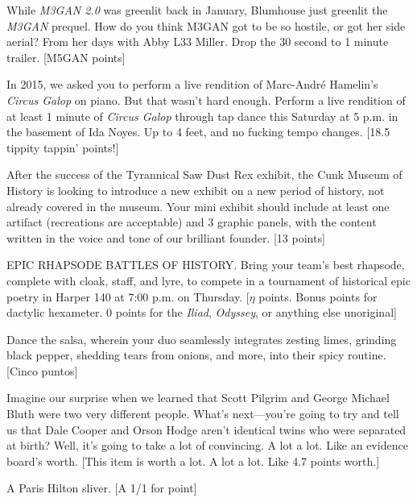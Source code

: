 \documentclass{book}
\begin{document}
\begin{list}{}{}
\item While \textit{M3GAN 2.0} was greenlit back in January, Blumhouse just greenlit the \textit{M3GAN} prequel. How do you think M3GAN got to be so hostile, or got her side aerial? From her days with Abby L33 Miller. Drop the 30 second to 1 minute trailer. [M5GAN points]
\item In 2015, we asked you to perform a live rendition of Marc-André Hamelin’s \textit{Circus Galop} on piano. But that wasn’t hard enough. Perform a live rendition of at least 1 minute of \textit{Circus Galop} through tap dance this Saturday at 5 p.m. in the basement of Ida Noyes. Up to 4 feet, and no fucking tempo changes. [18.5 tippity tappin' points!]
\item After the success of the Tyrannical Saw Dust Rex exhibit, the Cunk Museum of History is looking to introduce a new exhibit on a new period of history, not already covered in the museum. Your mini exhibit should include at least one artifact (recreations are acceptable) and 3 graphic panels, with the content written in the voice and tone of our brilliant founder. [13 points]
\item EPIC RHAPSODE BATTLES OF HISTORY. Bring your team’s best rhapsode, complete with cloak, staff, and lyre,  to compete in a tournament of historical epic poetry in Harper 140 at 7:00 p.m. on Thursday. [$\eta$ points. Bonus points for dactylic hexameter. 0 points for the \textit{Iliad}, \textit{Odyssey}, or anything else unoriginal]
\item Dance the salsa, wherein your duo seamlessly integrates zesting limes, grinding black pepper, shedding tears from onions, and more, into their spicy routine. [Cinco puntos]
\item Imagine our surprise when we learned that Scott Pilgrim and George Michael Bluth were two very different people. What’s next---you’re going to try and tell us that Dale Cooper and Orson Hodge aren’t identical twins who were separated at birth? Well, it's going to take a lot of convincing. A lot a lot. Like an evidence board’s worth. [This item is worth a lot. A lot a lot. Like 4.7 points worth.]
\item A Paris Hilton sliver. [A 1/1 for  point]


\end{list}
\end{document}
